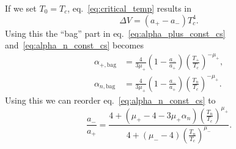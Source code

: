 If we set $T_0 = T_c$, eq.~\eqref{eq:critical_temp} results in
\begin{equation}
\Delta V = (a_+ - a_-) T_c^4.
\end{equation}
Using this the ``bag'' part in eq.~\eqref{eq:alpha_plus_const_cs} and~\eqref{eq:alpha_n_const_cs} becomes
\begin{align}
\alpha_{+,\text{bag}} &= \frac{4}{3 \mu_+} \left( 1 - \frac{a_-}{a_+} \right) \left( \frac{T_+}{T_c} \right)^{-\mu_+}, \\
\alpha_{n,\text{bag}} &= \frac{4}{3 \mu_+} \left( 1 - \frac{a_-}{a_+} \right) \left( \frac{T_n}{T_c} \right)^{-\mu_+}.
\end{align}
Using this we can reorder eq.~\eqref{eq:alpha_n_const_cs} to
\begin{equation}
\frac{a_-}{a_+} = \frac{4 + \left( \mu_+ - 4 - 3 \mu_+ \alpha_n \right) \left(\frac{T_n}{T_c}\right)^{\mu_+}}{4 + \left( \mu_- - 4 \right) \left(\frac{T_n}{T_c}\right)^{\mu_-}}.
\end{equation}

